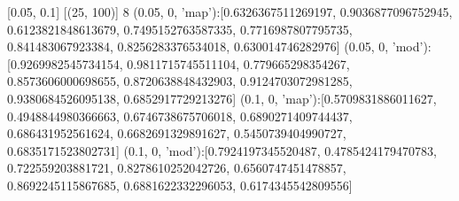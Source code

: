 [0.05, 0.1]
[(25, 100)]
8
(0.05, 0, 'map'):[0.6326367511269197, 0.9036877096752945, 0.6123821848613679, 0.7495152763587335, 0.7716987807795735, 0.841483067923384, 0.8256283376534018, 0.630014746282976]
(0.05, 0, 'mod'):[0.9269982545734154, 0.9811715745511104, 0.779665298354267, 0.8573606000698655, 0.8720638848432903, 0.9124703072981285, 0.9380684526095138, 0.6852917729213276]
(0.1, 0, 'map'):[0.5709831886011627, 0.4948844980366663, 0.6746738675706018, 0.6890271409744437, 0.686431952561624, 0.6682691329891627, 0.5450739404990727, 0.6835171523802731]
(0.1, 0, 'mod'):[0.7924197345520487, 0.4785424179470783, 0.722559203881721, 0.8278610252042726, 0.6560747451478857, 0.8692245115867685, 0.6881622332296053, 0.6174345542809556]
